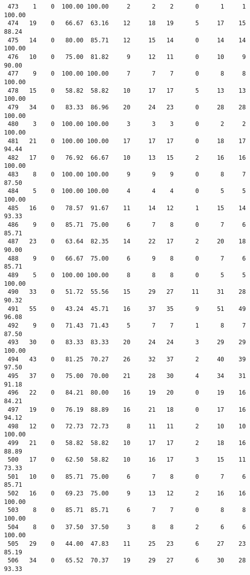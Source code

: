 \begin{verbatim}
 473    1    0  100.00 100.00     2      2    2      0      1     1   100.00
 474   19    0   66.67  63.16    12     18   19      5     17    15    88.24
 475   14    0   80.00  85.71    12     15   14      0     14    14   100.00
 476   10    0   75.00  81.82     9     12   11      0     10     9    90.00
 477    9    0  100.00 100.00     7      7    7      0      8     8   100.00
 478   15    0   58.82  58.82    10     17   17      5     13    13   100.00
 479   34    0   83.33  86.96    20     24   23      0     28    28   100.00
 480    3    0  100.00 100.00     3      3    3      0      2     2   100.00
 481   21    0  100.00 100.00    17     17   17      0     18    17    94.44
 482   17    0   76.92  66.67    10     13   15      2     16    16   100.00
 483    8    0  100.00 100.00     9      9    9      0      8     7    87.50
 484    5    0  100.00 100.00     4      4    4      0      5     5   100.00
 485   16    0   78.57  91.67    11     14   12      1     15    14    93.33
 486    9    0   85.71  75.00     6      7    8      0      7     6    85.71
 487   23    0   63.64  82.35    14     22   17      2     20    18    90.00
 488    9    0   66.67  75.00     6      9    8      0      7     6    85.71
 489    5    0  100.00 100.00     8      8    8      0      5     5   100.00
 490   33    0   51.72  55.56    15     29   27     11     31    28    90.32
 491   55    0   43.24  45.71    16     37   35      9     51    49    96.08
 492    9    0   71.43  71.43     5      7    7      1      8     7    87.50
 493   30    0   83.33  83.33    20     24   24      3     29    29   100.00
 494   43    0   81.25  70.27    26     32   37      2     40    39    97.50
 495   37    0   75.00  70.00    21     28   30      4     34    31    91.18
 496   22    0   84.21  80.00    16     19   20      0     19    16    84.21
 497   19    0   76.19  88.89    16     21   18      0     17    16    94.12
 498   12    0   72.73  72.73     8     11   11      2     10    10   100.00
 499   21    0   58.82  58.82    10     17   17      2     18    16    88.89
 500   17    0   62.50  58.82    10     16   17      3     15    11    73.33
 501   10    0   85.71  75.00     6      7    8      0      7     6    85.71
 502   16    0   69.23  75.00     9     13   12      2     16    16   100.00
 503    8    0   85.71  85.71     6      7    7      0      8     8   100.00
 504    8    0   37.50  37.50     3      8    8      2      6     6   100.00
 505   29    0   44.00  47.83    11     25   23      6     27    23    85.19
 506   34    0   65.52  70.37    19     29   27      6     30    28    93.33

\end{verbatim}
